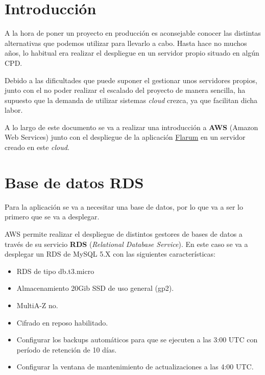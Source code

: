 \documentclass{\ClassPath/viu-tfm-template}
\begin{document}
    \graphicspath{{../VIU_TFM_LaTeX_template/}}

    \coverpage

    \tableofcontents

\chapter{Introducción}

A la hora de poner un proyecto en producción es aconsejable conocer las distintas alternativas que podemos utilizar para llevarlo a cabo. Hasta hace no muchos años, lo habitual era realizar el despliegue en un servidor propio situado en algún CPD.

Debido a las dificultades que puede suponer el gestionar unos servidores propios, junto con el no poder realizar el escalado del proyecto de manera sencilla, ha supuesto que la demanda de utilizar sistemas \textit{cloud} crezca, ya que facilitan dicha labor.

A lo largo de este documento se va a realizar una introducción a \textbf{AWS} (Amazon Web Services) junto con el despliegue de la aplicación \href{https://flarum.org/}{Flarum} en un servidor creado en este \textit{cloud}.


\chapter{Base de datos RDS}
Para la aplicación se va a necesitar una base de datos, por lo que va a ser lo primero que se va a desplegar.

AWS permite realizar el despliegue de distintos gestores de bases de datos a través de su servicio \textbf{RDS} (\textit{Relational Database Service}). En este caso se va a desplegar un RDS de MySQL 5.X con las siguientes características:

\begin{itemize}
    \item RDS de tipo db.t3.micro
    \item Almacenamiento 20Gib SSD de uso general (gp2).
    \item MultiA-Z no.
    \item Cifrado en reposo habilitado.
    \item Configurar los backups automáticos para que se ejecuten a las 3:00 UTC con período de retención de 10
    días.
    \item Configurar la ventana de mantenimiento de actualizaciones a las 4:00 UTC.
\end{itemize}
\end{document}
